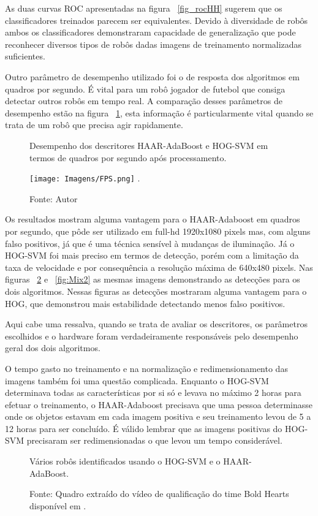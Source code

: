 As duas curvas ROC apresentadas na figura ~\ref{fig_rocHH} sugerem que os classificadores treinados parecem ser equivalentes. Devido à diversidade de robôs ambos os classificadores demonstraram capacidade de generalização que pode reconhecer diversos tipos de robôs dadas imagens de treinamento normalizadas suficientes.

Outro parâmetro de desempenho utilizado foi o de resposta dos algoritmos em quadros por segundo. É vital para um robô jogador de futebol que consiga detectar outros robôs em tempo real. A comparação desses parâmetros de desempenho estão na figura ~\ref{fig_fps}, esta informação é particularmente vital quando se trata de um robô que precisa agir rapidamente.

\begin{figure}[!h!t!]
\centering \caption{Desempenho dos descritores HAAR-AdaBoost e HOG-SVM em termos de quadros por segundo após processamento.}
\texttt{[image: Imagens/FPS.png]}
\DeclareGraphicsExtensions.
\caption*{Fonte: Autor}
\label{fig_fps}
\end{figure}

Os resultados mostram alguma vantagem para o HAAR-Adaboost em quadros por segundo, que pôde ser utilizado em full-hd 1920x1080 pixels mas, com alguns falso positivos, já que é uma técnica sensível à mudanças de iluminação. Já o HOG-SVM foi mais preciso em termos de detecção, porém com a limitação da taxa de velocidade e por consequência a resolução máxima de 640x480 pixels. Nas figuras ~\ref{fig:Mix1} e ~\ref{fig:Mix2} as mesmas imagens demonstrando as detecções para os dois algoritmos. Nessas figuras as detecções mostraram alguma vantagem para o HOG, que demonstrou mais estabilidade detectando menos falso positivos.

Aqui cabe uma ressalva, quando se trata de avaliar os descritores, os parâmetros escolhidos e o hardware foram verdadeiramente responsáveis pelo desempenho geral dos dois algoritmos.

O tempo gasto no treinamento e na normalização e redimensionamento das imagens também foi uma questão complicada. Enquanto o HOG-SVM determinava todas as características por si só e levava no máximo 2 horas para efetuar o treinamento, o HAAR-Adaboost precisava que uma pessoa determinasse onde os objetos estavam em cada imagem positiva e seu treinamento levou de 5 a 12 horas para ser concluído. É válido lembrar que as imagens positivas do HOG-SVM precisaram ser redimensionadas o que levou um tempo considerável.


\begin{figure}[!h!t!]%
    \centering  \caption{Vários robôs identificados usando o HOG-SVM e o HAAR-AdaBoost.}%
    \qquad
\caption*{Fonte: Quadro extraído do vídeo de qualificação do time Bold Hearts \cite{Bold} disponível em .}
    \label{fig:Mix1}%
\end{figure}

